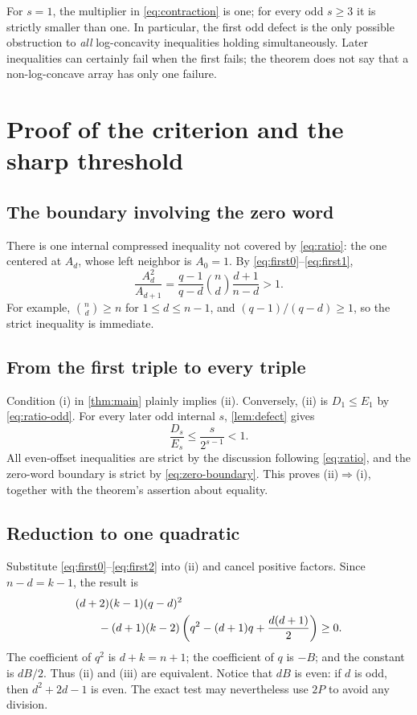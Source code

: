 \documentclass[11pt,letterpaper]{article}
\numberwithin{equation}{section}
\theoremstyle{definition}
\begin{document}
For $s=1$, the multiplier in \eqref{eq:contraction} is one; for every
odd $s\ge3$ it is strictly smaller than one. In particular, the
first odd defect is the only possible obstruction to \emph{all}
log-concavity inequalities holding simultaneously. Later inequalities
can certainly fail when the first fails; the theorem does not say
that a non-log-concave array has only one failure.

\section{Proof of the criterion and the sharp threshold}

\subsection{The boundary involving the zero word}
There is one internal compressed inequality not covered by
\eqref{eq:ratio}: the one centered at $A_d$, whose left neighbor is
$A_0=1$. By \eqref{eq:first0}--\eqref{eq:first1},
\begin{equation}\label{eq:zero-boundary}
 \frac{A_d^2}{A_{d+1}}
 =\frac{q-1}{q-d}\binom nd\frac{d+1}{n-d}>1.
\end{equation}
For example, $\binom nd\ge n$ for $1\le d\le n-1$, and
$(q-1)/(q-d)\ge1$, so the strict inequality is immediate.

\subsection{From the first triple to every triple}
Condition (i) in \cref{thm:main} plainly implies (ii). Conversely,
(ii) is $D_1\le E_1$ by \eqref{eq:ratio-odd}.
For every later odd internal $s$, \cref{lem:defect} gives
\[
 \frac{D_s}{E_s}\le\frac{s}{2^{s-1}}<1.
\]
All even-offset inequalities are strict by the discussion following
\eqref{eq:ratio}, and the zero-word boundary is strict by
\eqref{eq:zero-boundary}. This proves (ii)$\Rightarrow$(i), together
with the theorem's assertion about equality.

\subsection{Reduction to one quadratic}
Substitute \eqref{eq:first0}--\eqref{eq:first2} into (ii) and cancel
positive factors. Since $n-d=k-1$, the result is
\begin{align}
 &(d+2)(k-1)(q-d)^2\notag\\
 &\hspace{2em}-(d+1)(k-2)
       \left(q^2-(d+1)q+\frac{d(d+1)}2\right)\ge0.
       \label{eq:expandedfirst}
\end{align}
The coefficient of $q^2$ is $d+k=n+1$; the coefficient of $q$ is
$-B$; and the constant is $dB/2$. Thus (ii) and (iii) are equivalent.
Notice that $dB$ is even: if $d$ is odd, then $d^2+2d-1$ is even.
The exact test may nevertheless use $2P$ to avoid any division.
\end{document}
